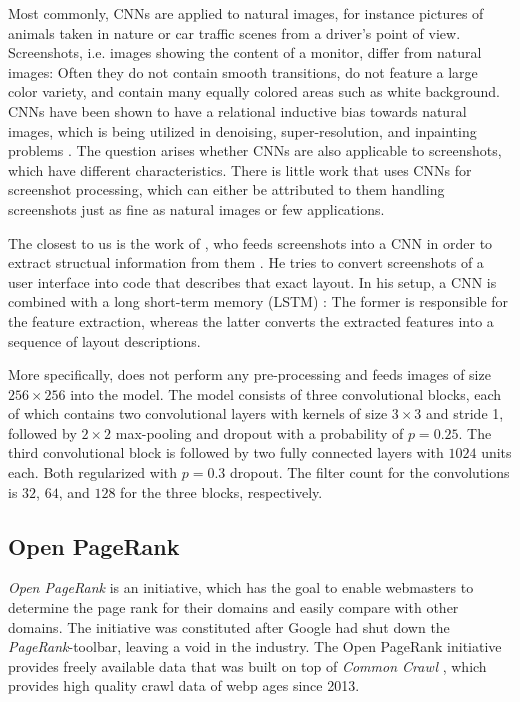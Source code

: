 Most commonly, CNNs are applied to natural images, for instance pictures of animals taken in nature or car traffic scenes from a driver's point of view.
Screenshots, i.e. images showing the content of a monitor, differ from natural images: Often they do not contain smooth transitions, do not feature a large color variety, and contain many equally colored areas such as white background.
CNNs have been shown to have a relational inductive bias towards natural images, which is being utilized in denoising, super-resolution, and inpainting problems \cite{deepimageprior}.
The question arises whether CNNs are also applicable to screenshots, which have different characteristics. There is little work that uses CNNs for screenshot processing, which can either be attributed to them handling screenshots just as fine as natural images or few applications.

The closest to us is the work of \citeauthor{beltramelli:pix2code}, who feeds screenshots into a CNN in order to extract structual information from them \cite{beltramelli:pix2code}. He tries to convert screenshots of a user interface into code that describes that exact layout. In his setup, a CNN is combined with a long short-term memory (LSTM) \cite{hochreiter1997lstm}: The former is responsible for the feature extraction, whereas the latter converts the extracted features into a sequence of layout descriptions.

More specifically, \citeauthor{beltramelli:pix2code} does not perform any pre-processing and feeds images of size $256\times 256$ into the model. The model consists of three convolutional blocks, each of which contains two convolutional layers with kernels of size $3\times 3$ and stride 1, followed by $2\times 2$ max-pooling and dropout \cite{srivastava2014:dropout} with a probability of $p=0.25$. The third convolutional block is followed by two fully connected layers with $1024$ units each. Both regularized with $p=0.3$ dropout. The filter count for the convolutions is $32$, $64$, and $128$ for the three blocks, respectively.

\subsection{Open PageRank}
\label{OpenPageRank}
\textit{Open PageRank} \cite{OpenPageRank} is an initiative, which has the goal to enable webmasters to determine the page rank for their domains and easily compare with other domains. The initiative was constituted after Google had shut down the \textit{PageRank}-toolbar, leaving a void in the industry. The Open PageRank initiative provides freely available data that was built on top of \textit{Common Crawl} \cite{CommonCrawl}, which provides high quality crawl data of webp ages since 2013.

